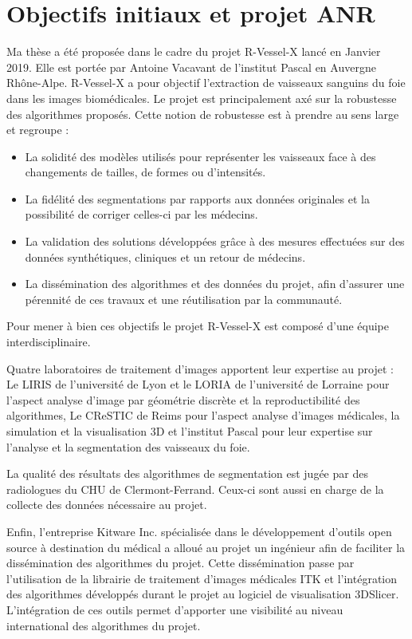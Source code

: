 \section{Objectifs initiaux et projet ANR}
\label{sec:introduction:objectifs}

Ma thèse a été proposée dans le cadre du projet R-Vessel-X lancé en Janvier 2019. Elle est portée par Antoine Vacavant de l'institut Pascal en Auvergne Rhône-Alpe. R-Vessel-X a pour objectif l'extraction de vaisseaux sanguins du foie dans les images biomédicales. Le projet est principalement axé sur la robustesse des algorithmes proposés. Cette notion de robustesse est à prendre au sens large et regroupe :

\begin{itemize}
\item La solidité des modèles utilisés pour représenter les vaisseaux face à des changements de tailles, de formes ou d'intensités.
\item La fidélité des segmentations par rapports aux données originales et la possibilité de corriger celles-ci par les médecins.
\item La validation des solutions développées grâce à des mesures effectuées sur des données synthétiques, cliniques et un retour de médecins.
\item La dissémination des algorithmes et des données du projet, afin d'assurer une pérennité de ces travaux et une réutilisation par la communauté.
\end{itemize}

Pour mener à bien ces objectifs le projet R-Vessel-X est composé d'une équipe interdisciplinaire.

Quatre laboratoires de traitement d'images apportent leur expertise au projet : Le LIRIS de l'université de Lyon et le LORIA de l'université de Lorraine pour l'aspect analyse d'image par géométrie discrète et la reproductibilité des algorithmes, Le CReSTIC de Reims pour l'aspect analyse d'images médicales, la simulation et la visualisation 3D et l'institut Pascal pour leur expertise sur l'analyse et la segmentation des vaisseaux du foie.

La qualité des résultats des algorithmes de segmentation est jugée par des radiologues du CHU de Clermont-Ferrand. Ceux-ci sont aussi en charge de la collecte des données nécessaire au projet.

Enfin, l'entreprise Kitware Inc. spécialisée dans le développement d'outils open source à destination du médical a alloué au projet un ingénieur afin de faciliter la dissémination des algorithmes du projet. Cette dissémination passe par l'utilisation de la librairie de traitement d'images médicales ITK et l'intégration des algorithmes développés durant le projet au logiciel de visualisation 3DSlicer. L'intégration de ces outils permet d'apporter une visibilité au  niveau international des algorithmes du projet.

